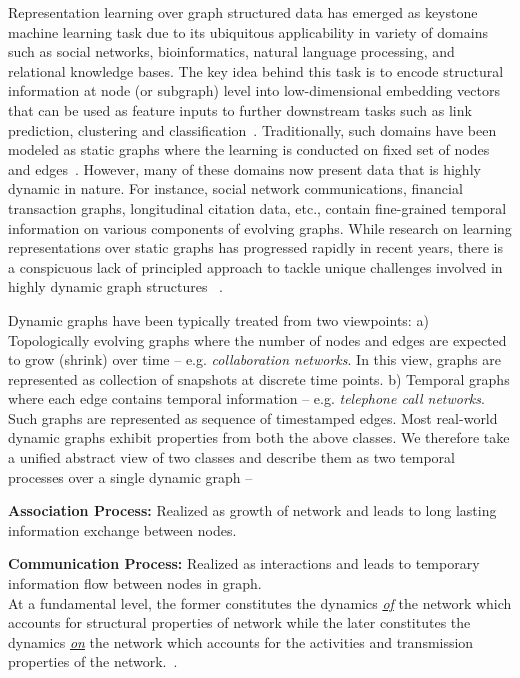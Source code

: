 \documentclass[11pt]{article}
\begin{document}
Representation learning over graph structured data has emerged as keystone machine learning task due to its ubiquitous applicability in variety of domains such as social networks, bioinformatics, natural language processing, and relational knowledge bases. The key idea behind this task is to encode structural information at node (or subgraph) level 
into low-dimensional embedding vectors that can be used as feature inputs to further downstream tasks such as link prediction, clustering and classification~\cite{AkoTonKou15, GetTas07, LbKle03, SenNamBilMusGetGakEli08}. Traditionally, such domains have been modeled as static graphs where the learning is conducted on fixed set of nodes and edges~\cite{CaoLuXu15,GroLes16,PerAlSki14,TanQuWanZhaetal15,WanCuiZhu16,WanCuiWanPeiZhuYan17,XuWeiCaoYu17}. However, many of these domains now present data that is highly dynamic in nature. For instance, social network communications, financial transaction graphs, longitudinal citation data, etc., contain fine-grained temporal information on various components of evolving graphs. While research on learning representations over static graphs has progressed rapidly in recent years, there is a conspicuous lack of principled approach to tackle unique challenges involved in highly dynamic graph structures ~\cite{HamYinLes2017}.

Dynamic graphs have been typically treated from two viewpoints: a) Topologically evolving graphs where the number of nodes and edges are expected to grow (shrink) over time -- e.g. \textit{collaboration networks}. In this view, graphs are represented as collection of snapshots at discrete time points.  b) Temporal graphs where each edge contains temporal information -- e.g. \textit{telephone call networks}. Such graphs are represented as sequence of timestamped edges.
Most real-world dynamic graphs exhibit properties from both the above classes. We therefore take a unified abstract view of two classes and describe them as two temporal processes over a single dynamic graph --

{\bf Association Process:} Realized as growth of network and leads to long lasting information exchange between nodes. 

{\bf Communication Process:} Realized as interactions and leads to temporary information flow between nodes in graph.\\
At a fundamental level, the former constitutes the dynamics \underline{\textit{of}} the network which accounts for structural properties of network while the later constitutes the dynamics \underline{\textit{on}} the network which accounts for the activities and transmission properties of the network.~\cite{Far17, ArtRamMig17}.
\end{document}
